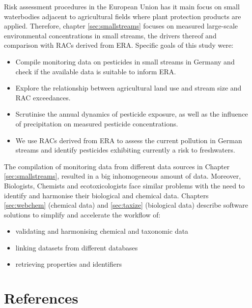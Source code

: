 \noindent Risk assessment procedures in the European Union has it main focus on small waterbodies adjacent to agricultural fields where plant protection products are applied.
Therefore, chapter \ref{sec:smallstreams} focuses on measured large-scale environmental concentrations in small streams, the drivers thereof and comparison with RACs derived from ERA.
Specific goals of this study were:
\begin{itemize}
	\item Compile monitoring data on pesticides in small streams in Germany and check if the available data is suitable to inform ERA.
	\item Explore the relationship between agricultural land use and stream size and RAC exceedances.
	\item Scrutinise the annual dynamics of pesticide exposure, as well as the influence of precipitation on measured pesticide concentrations.
	\item We use RACs derived from ERA to assess the current pollution in German streams and identify pesticides exhibiting currently a risk to freshwaters.
\end{itemize}

\noindent
The compilation of monitoring data from different data sources in Chapter \ref{sec:smallstreams}, resulted in a big inhomogeneous amount of data.
Moreover, Biologists, Chemists and ecotoxicologists face similar problems with the need to identify and harmonise their biological and chemical data.
Chapters \ref{sec:webchem} (chemical data) and \ref{sec:taxize} (biological data) describe software solutions to simplify and accelerate the workflow of:

\begin{itemize}
	\item validating and harmonising chemical and taxonomic data
	\item linking datasets from different databases
	\item retrieving properties and identifiers
\end{itemize}






\clearpage
\section{References}
\printbibliography[heading=none]
